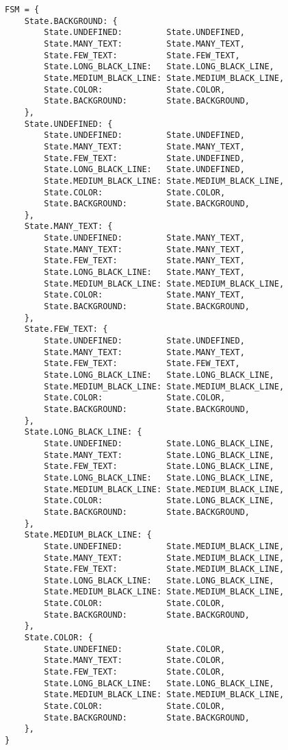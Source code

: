 \begin{lstlisting}[caption={Конечный автомат}, label={lst:fsm}]
FSM = {
    State.BACKGROUND: {
        State.UNDEFINED:         State.UNDEFINED,
        State.MANY_TEXT:         State.MANY_TEXT,
        State.FEW_TEXT:          State.FEW_TEXT,
        State.LONG_BLACK_LINE:   State.LONG_BLACK_LINE,
        State.MEDIUM_BLACK_LINE: State.MEDIUM_BLACK_LINE,
        State.COLOR:             State.COLOR,
        State.BACKGROUND:        State.BACKGROUND,
    },
    State.UNDEFINED: {
        State.UNDEFINED:         State.UNDEFINED,
        State.MANY_TEXT:         State.MANY_TEXT,
        State.FEW_TEXT:          State.UNDEFINED,
        State.LONG_BLACK_LINE:   State.UNDEFINED,
        State.MEDIUM_BLACK_LINE: State.MEDIUM_BLACK_LINE,
        State.COLOR:             State.COLOR,
        State.BACKGROUND:        State.BACKGROUND,
    },
    State.MANY_TEXT: {
        State.UNDEFINED:         State.MANY_TEXT,
        State.MANY_TEXT:         State.MANY_TEXT,
        State.FEW_TEXT:          State.MANY_TEXT,
        State.LONG_BLACK_LINE:   State.MANY_TEXT,
        State.MEDIUM_BLACK_LINE: State.MEDIUM_BLACK_LINE,
        State.COLOR:             State.MANY_TEXT,
        State.BACKGROUND:        State.BACKGROUND,
    },
    State.FEW_TEXT: {
        State.UNDEFINED:         State.UNDEFINED,
        State.MANY_TEXT:         State.MANY_TEXT,
        State.FEW_TEXT:          State.FEW_TEXT,
        State.LONG_BLACK_LINE:   State.LONG_BLACK_LINE,
        State.MEDIUM_BLACK_LINE: State.MEDIUM_BLACK_LINE,
        State.COLOR:             State.COLOR,
        State.BACKGROUND:        State.BACKGROUND,
    },
    State.LONG_BLACK_LINE: {
        State.UNDEFINED:         State.LONG_BLACK_LINE,
        State.MANY_TEXT:         State.LONG_BLACK_LINE,
        State.FEW_TEXT:          State.LONG_BLACK_LINE,
        State.LONG_BLACK_LINE:   State.LONG_BLACK_LINE,
        State.MEDIUM_BLACK_LINE: State.MEDIUM_BLACK_LINE,
        State.COLOR:             State.LONG_BLACK_LINE,
        State.BACKGROUND:        State.BACKGROUND,
    },
    State.MEDIUM_BLACK_LINE: {
        State.UNDEFINED:         State.MEDIUM_BLACK_LINE,
        State.MANY_TEXT:         State.MEDIUM_BLACK_LINE,
        State.FEW_TEXT:          State.MEDIUM_BLACK_LINE,
        State.LONG_BLACK_LINE:   State.LONG_BLACK_LINE,
        State.MEDIUM_BLACK_LINE: State.MEDIUM_BLACK_LINE,
        State.COLOR:             State.COLOR,
        State.BACKGROUND:        State.BACKGROUND,
    },
    State.COLOR: {
        State.UNDEFINED:         State.COLOR,
        State.MANY_TEXT:         State.COLOR,
        State.FEW_TEXT:          State.COLOR,
        State.LONG_BLACK_LINE:   State.LONG_BLACK_LINE,
        State.MEDIUM_BLACK_LINE: State.MEDIUM_BLACK_LINE,
        State.COLOR:             State.COLOR,
        State.BACKGROUND:        State.BACKGROUND,
    },
}
\end{lstlisting}

